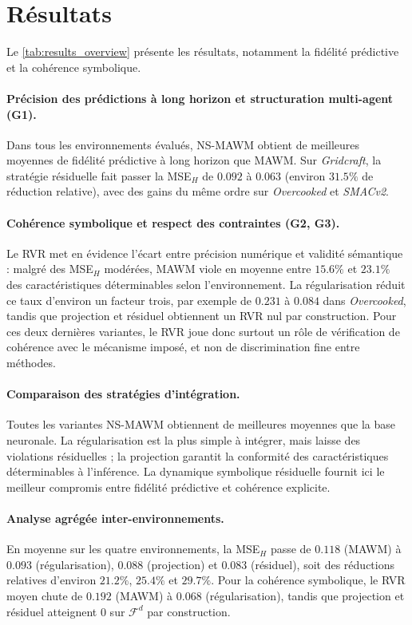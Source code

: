 \documentclass[final]{jfsma}
\theoremstyle{plain}
\theoremstyle{definition}
\theoremstyle{remark}
\begin{document}
\section{Résultats}
\label{sec:results}

Le \autoref{tab:results_overview} présente les résultats, notamment la fidélité prédictive et la cohérence symbolique.

\paragraph{Précision des prédictions à long horizon et structuration multi-agent (G1).}
Dans tous les environnements évalués, NS-MAWM obtient de meilleures moyennes de fidélité prédictive à long horizon que MAWM. Sur \emph{Gridcraft}, la stratégie résiduelle fait passer la MSE$_H$ de $0.092$ à $0.063$ (environ $31.5\%$ de réduction relative), avec des gains du même ordre sur \emph{Overcooked} et \emph{SMACv2}.

\paragraph{Cohérence symbolique et respect des contraintes (G2, G3).}
Le RVR met en évidence l'écart entre précision numérique et validité sémantique : malgré des MSE$_H$ modérées, MAWM viole en moyenne entre $15.6\%$ et $23.1\%$ des caractéristiques déterminables selon l'environnement. La régularisation réduit ce taux d'environ un facteur trois, par exemple de $0.231$ à $0.084$ dans \emph{Overcooked}, tandis que projection et résiduel obtiennent un RVR nul par construction. Pour ces deux dernières variantes, le RVR joue donc surtout un rôle de vérification de cohérence avec le mécanisme imposé, et non de discrimination fine entre méthodes.


\paragraph{Comparaison des stratégies d'intégration.}
Toutes les variantes NS-MAWM obtiennent de meilleures moyennes que la base neuronale. La régularisation est la plus simple à intégrer, mais laisse des violations résiduelles ; la projection garantit la conformité des caractéristiques déterminables à l'inférence. La dynamique symbolique résiduelle fournit ici le meilleur compromis entre fidélité prédictive et cohérence explicite.

\paragraph{Analyse agrégée inter-environnements.}
En moyenne sur les quatre environnements, la MSE$_H$ passe de $0.118$ (MAWM) à $0.093$ (régularisation), $0.088$ (projection) et $0.083$ (résiduel), soit des réductions relatives d'environ $21.2\%$, $25.4\%$ et $29.7\%$. Pour la cohérence symbolique, le RVR moyen chute de $0.192$ (MAWM) à $0.068$ (régularisation), tandis que projection et résiduel atteignent $0$ sur $\mathcal{F}^d$ par construction.
\end{document}
